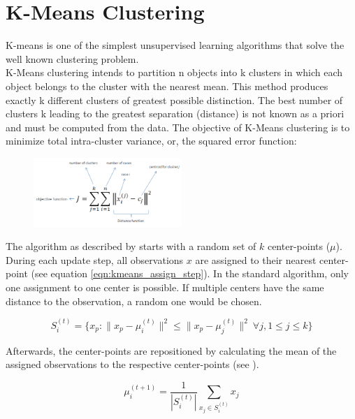 \section{ K-Means Clustering }\label{kmeans}
K-means \cite{kmeans} is one of the simplest unsupervised learning algorithms that solve the well known clustering problem. \\ K-Means clustering intends to partition n objects into k clusters in which each object belongs to the cluster with the nearest mean. This method produces exactly k different clusters of greatest possible distinction. The best number of clusters k leading to the greatest separation (distance) is not known as a priori and must be computed from the data. The objective of K-Means clustering is to minimize total intra-cluster variance, or, the squared error function:
\begin{figure}[H]
\centering
\includegraphics[width=0.5\textwidth]{img/ckmeans.png}
\end{figure}

 The algorithm as described by \cite{kmeans} starts with a random set of $k$ center-points ($\mu$). During each update step, all observations $x$ are assigned to their nearest center-point (see equation \ref{eqn:kmeans_assign_step}). In the standard algorithm, only one assignment to one center is possible. If multiple centers have the same distance to the observation, a random one would be chosen.

\begin{equation}
S_i^{(t)} = \big \{ x_p : \big \| x_p - \mu^{(t)}_i \big \|^2 \le \big \| x_p - \mu^{(t)}_j \big \|^2 \ \forall j, 1 \le j \le k \big\}
\label{eqn:kmeans_assign_step}
\end{equation}

Afterwards, the center-points are repositioned by calculating the mean of the assigned observations to the respective center-points (see ).

\begin{equation}
\mu^{(t+1)}_i = \frac{1}{|S^{(t)}_i|} \sum_{x_j \in S^{(t)}_i} x_j
\label{eqn:kmeans_update_step}
\end{equation}

